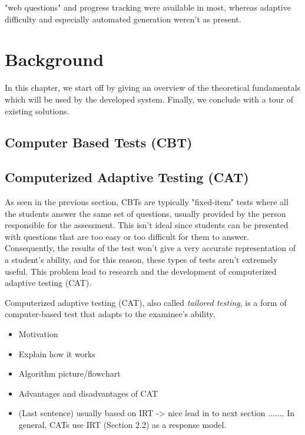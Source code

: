 \documentclass[11pt,a4paper]{report}
\begin{document}
 
"web questions" and progress tracking were available in most, whereas adaptive difficulty and especially automated generation weren't as present. 



\chapter{Background}
In this chapter, we start off by giving an overview of the theoretical fundamentals which will be used by the developed system. Finally, we conclude with a tour of existing solutions.

\section{Computer Based Tests (CBT)}

\section{Computerized Adaptive Testing (CAT)}
As seen in the previous section, CBTs are typically "fixed-item" tests where all the students answer the same set of questions,  usually provided by the person responsible for the assessment. This isn't ideal since students can be presented with questions that are too easy or too difficult for them to answer. Consequently, the results of the test won't give a very accurate representation of a student's ability, and for this reason, these types of tests aren't extremely useful. This problem lead to research and the development of computerized adaptive testing (CAT). \newline

Computerized adaptive testing (CAT), also called \textit{tailored testing}, is a form of computer-based test that adapts to the examinee's ability. 

\begin{itemize}
\item Motivation
\item Explain how it works
\item Algorithm picture/flowchart
\item Advantages and disadvantages of CAT
\item (Last sentence) usually based on IRT -> nice lead in to next section ....... In general, CATs use IRT (Section 2.2) as a response model.
\end{itemize}
\end{document}
